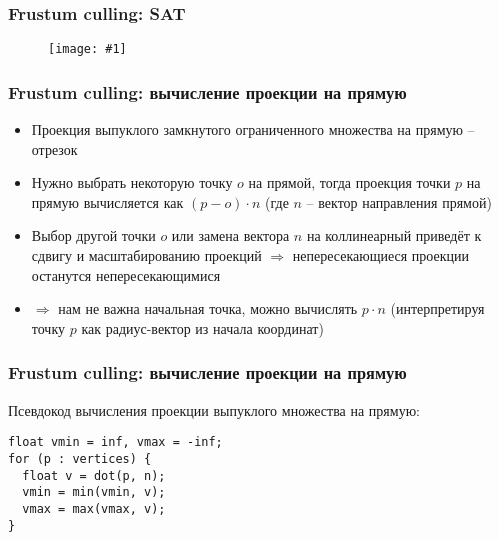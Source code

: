 \documentclass{beamer}
\newcommand{\slideimage}[1]{
  \begin{figure}
    \begin{adjustbox}{width=\textwidth, totalheight=\textheight-2\baselineskip-2\baselineskip,keepaspectratio}
      \texttt{[image: \#1]}
    \end{adjustbox}
  \end{figure}
}
\begin{document}
\begin{frame}[fragile]
\frametitle{Frustum culling: SAT}
\slideimage{sat.png}
\end{frame}

\begin{frame}[fragile]
\frametitle{Frustum culling: вычисление проекции на прямую}
\begin{itemize}
\item Проекция выпуклого замкнутого ограниченного множества на прямую -- отрезок
\pause
\item Нужно выбрать некоторую точку \begin{math}o\end{math} на прямой, тогда проекция точки \begin{math}p\end{math} на прямую вычисляется как \begin{math}(p - o) \cdot n\end{math} (где \begin{math}n\end{math} -- вектор направления прямой)
\pause
\item Выбор другой точки \begin{math}o\end{math} или замена вектора \begin{math}n\end{math} на коллинеарный приведёт к сдвигу и масштабированию проекций \begin{math}\Longrightarrow\end{math} непересекающиеся проекции останутся непересекающимися
\pause
\item \begin{math}\Rightarrow\end{math} нам не важна начальная точка, можно вычислять \begin{math}p \cdot n\end{math} (интерпретируя точку \begin{math}p\end{math} как радиус-вектор из начала координат)
\end{itemize}
\end{frame}

\begin{frame}[fragile]
\frametitle{Frustum culling: вычисление проекции на прямую}
Псевдокод вычисления проекции выпуклого множества на прямую:
\begin{verbatim}
float vmin = inf, vmax = -inf;
for (p : vertices) {
  float v = dot(p, n);
  vmin = min(vmin, v);
  vmax = max(vmax, v);
}
\end{verbatim}
\end{frame}
\end{document}
